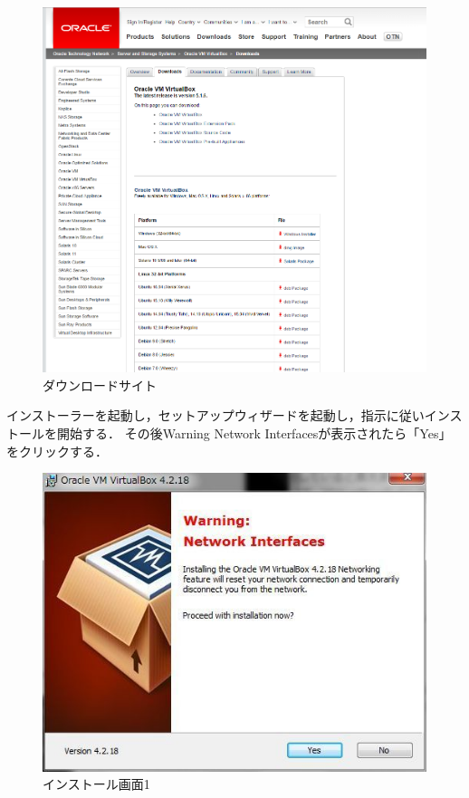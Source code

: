 \begin{figure}[htb]
\centering
\includegraphics[width=15cm]{oracle.png}
\caption{ダウンロードサイト}\label{virtualboxダウンロードサイトの画像}
\end{figure}

インストーラーを起動し，セットアップウィザードを起動し，指示に従いインストールを開始する．
その後Warning Network Interfacesが表示されたら「Yes」をクリックする．

\begin{figure}[htb]
\centering
\includegraphics[width=15cm]{setup1.png}
\caption{インストール画面1}\label{virtualboxインストール画面1}
\end{figure}

